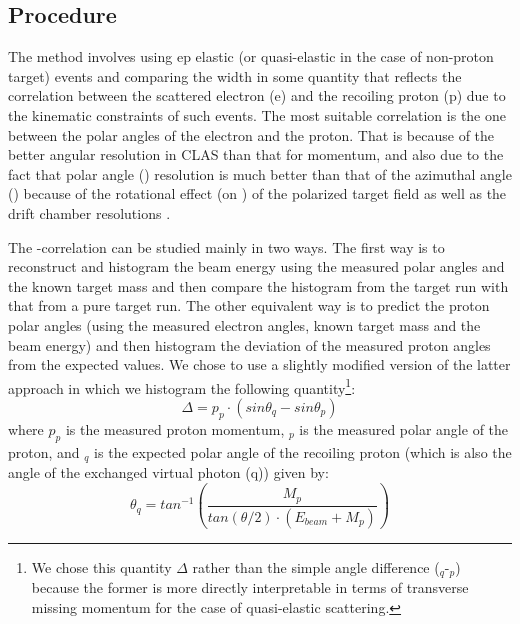\subsection{Procedure}
The method involves using ep elastic (or quasi-elastic in the case of non-proton target) events and comparing the width %
in some quantity that reflects the correlation between the scattered electron (e) and the recoiling proton (p) due to the kinematic constraints of such events. %
The most suitable correlation is the one between the polar angles of the electron and the proton. That is because of the better angular resolution in CLAS than that for momentum, and also due to the fact that polar angle (\thns) resolution is much better than that of the azimuthal angle (\phns) because of the rotational effect (on %
\phns) of the polarized target field as well as the drift chamber resolutions \cite{bostedD2Cont}.

The \thns-correlation can be studied mainly in two ways. The first way is to reconstruct and histogram the beam energy using the measured polar angles and the known target mass and then compare the histogram from the  target run with that from a pure  target run. %
The other equivalent way is to predict the proton polar angles (using the measured electron angles, known target mass and the beam energy) and then histogram the deviation of the measured proton angles from the expected values. We chose to use a slightly modified %
version of the latter approach %
in which we histogram the following quantity\footnote{We chose this quantity $\Delta$ rather than the simple angle difference (\thns$_q$-\thns$_p$) because the former is more %
directly interpretable in terms of transverse missing momentum for the case of quasi-elastic scattering.}: %
\begin{equation}
\Delta = p_p\cdot(sin\theta_q - sin\theta_p)
\label{pDsinTh}
\end{equation}
where $p_p$ is the measured proton momentum, \thns$_p$ is the measured polar angle of the proton, and \thns$_q$ is the expected polar angle of the recoiling proton (which is also the angle of the exchanged virtual photon (q)) given by:
\begin{equation}
\theta_q = tan^{-1}\left(\frac{M_p}{tan(\theta/2)\cdot(E_{beam}+M_p)} \right)%
\label{thQ}
\end{equation}

